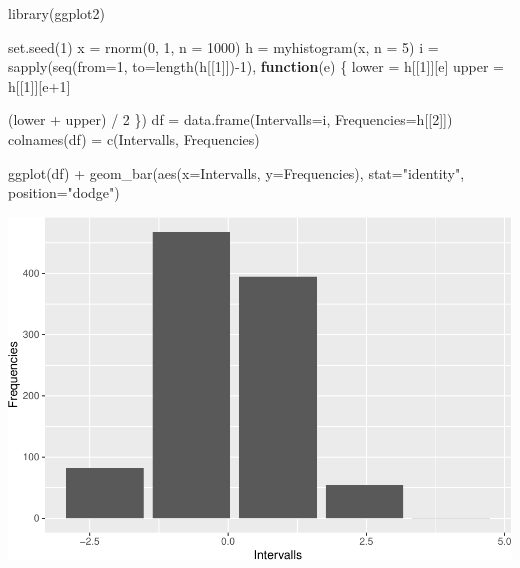 \documentclass[
]{article}
\newenvironment{Shaded}{\begin{snugshade}}{\end{snugshade}}
\newcommand{\AttributeTok}[1]{\textcolor[rgb]{0.77,0.63,0.00}{#1}}
\newcommand{\ControlFlowTok}[1]{\textcolor[rgb]{0.13,0.29,0.53}{\textbf{#1}}}
\newcommand{\DecValTok}[1]{\textcolor[rgb]{0.00,0.00,0.81}{#1}}
\newcommand{\FunctionTok}[1]{\textcolor[rgb]{0.00,0.00,0.00}{#1}}
\newcommand{\NormalTok}[1]{#1}
\newcommand{\OtherTok}[1]{\textcolor[rgb]{0.56,0.35,0.01}{#1}}
\newcommand{\SpecialCharTok}[1]{\textcolor[rgb]{0.00,0.00,0.00}{#1}}
\newcommand{\StringTok}[1]{\textcolor[rgb]{0.31,0.60,0.02}{#1}}
\begin{document}
\begin{Shaded}
\begin{Highlighting}[]
\FunctionTok{library}\NormalTok{(ggplot2)}

\FunctionTok{set.seed}\NormalTok{(}\DecValTok{1}\NormalTok{)}
\NormalTok{x }\OtherTok{=} \FunctionTok{rnorm}\NormalTok{(}\DecValTok{0}\NormalTok{, }\DecValTok{1}\NormalTok{, }\AttributeTok{n =} \DecValTok{1000}\NormalTok{)}
\NormalTok{h }\OtherTok{=} \FunctionTok{myhistogram}\NormalTok{(x, }\AttributeTok{n =} \DecValTok{5}\NormalTok{)}
\NormalTok{i }\OtherTok{=} \FunctionTok{sapply}\NormalTok{(}\FunctionTok{seq}\NormalTok{(}\AttributeTok{from=}\DecValTok{1}\NormalTok{, }\AttributeTok{to=}\FunctionTok{length}\NormalTok{(h[[}\DecValTok{1}\NormalTok{]])}\SpecialCharTok{{-}}\DecValTok{1}\NormalTok{), }\ControlFlowTok{function}\NormalTok{(e) \{}
\NormalTok{        lower }\OtherTok{=}\NormalTok{ h[[}\DecValTok{1}\NormalTok{]][e]}
\NormalTok{        upper }\OtherTok{=}\NormalTok{ h[[}\DecValTok{1}\NormalTok{]][e}\SpecialCharTok{+}\DecValTok{1}\NormalTok{]}

\NormalTok{        (lower }\SpecialCharTok{+}\NormalTok{ upper) }\SpecialCharTok{/} \DecValTok{2}
\NormalTok{    \})}
\NormalTok{df }\OtherTok{=} \FunctionTok{data.frame}\NormalTok{(}\AttributeTok{Intervalls=}\NormalTok{i, }\AttributeTok{Frequencies=}\NormalTok{h[[}\DecValTok{2}\NormalTok{]])}
\FunctionTok{colnames}\NormalTok{(df) }\OtherTok{=} \FunctionTok{c}\NormalTok{(}\StringTok{\textquotesingle{}Intervalls\textquotesingle{}}\NormalTok{, }\StringTok{\textquotesingle{}Frequencies\textquotesingle{}}\NormalTok{)}

\FunctionTok{ggplot}\NormalTok{(df) }\SpecialCharTok{+}
    \FunctionTok{geom\_bar}\NormalTok{(}\FunctionTok{aes}\NormalTok{(}\AttributeTok{x=}\NormalTok{Intervalls, }\AttributeTok{y=}\NormalTok{Frequencies), }\AttributeTok{stat=}\StringTok{"identity"}\NormalTok{, }\AttributeTok{position=}\StringTok{"dodge"}\NormalTok{)}
\end{Highlighting}
\end{Shaded}

\includegraphics{Testat_1_Complete_files/figure-latex/unnamed-chunk-7-1.pdf}
\end{document}
